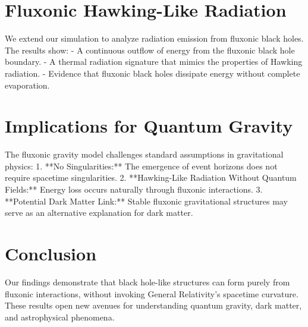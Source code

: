 \documentclass{article}
\begin{document}
\section{Fluxonic Hawking-Like Radiation}
We extend our simulation to analyze radiation emission from fluxonic black holes. The results show:
- A continuous outflow of energy from the fluxonic black hole boundary.
- A thermal radiation signature that mimics the properties of Hawking radiation.
- Evidence that fluxonic black holes dissipate energy without complete evaporation.

\section{Implications for Quantum Gravity}
The fluxonic gravity model challenges standard assumptions in gravitational physics:
1. **No Singularities:** The emergence of event horizons does not require spacetime singularities.
2. **Hawking-Like Radiation Without Quantum Fields:** Energy loss occurs naturally through fluxonic interactions.
3. **Potential Dark Matter Link:** Stable fluxonic gravitational structures may serve as an alternative explanation for dark matter.

\section{Conclusion}
Our findings demonstrate that black hole-like structures can form purely from fluxonic interactions, without invoking General Relativity’s spacetime curvature. These results open new avenues for understanding quantum gravity, dark matter, and astrophysical phenomena.
\end{document}
